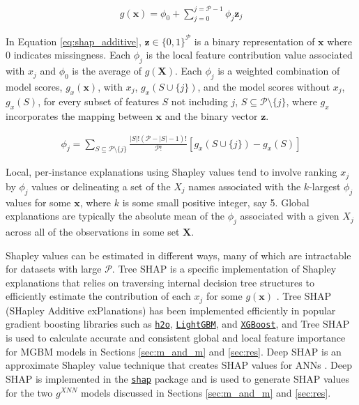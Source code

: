 \documentclass[information,article,submit,moreauthors,pdftex]{definitions/mdpi}
\begin{document}
\begin{equation}
\label{eq:shap_additive}
\begin{aligned}
g(\mathbf{x}) = \phi_0 + \sum_{j=0}^{j=\mathcal{P} - 1} \phi_j \mathbf{z}_j
\end{aligned}
\end{equation}

\noindent In Equation \ref{eq:shap_additive}, $\mathbf{z} \in \{0,1\}^\mathcal{P}$ is a binary representation of $\mathbf{x}$ where 0 indicates missingness. Each $\phi_j$ is the local feature contribution value associated with $x_j$ and $\phi_0$ is the average of $g(\mathbf{X})$. Each $\phi_j$ is a weighted combination of model scores, $g_x(\mathbf{x})$, with $x_j$, $g_x(S \cup \{j\})$, and the model scores without $x_j$, $g_x(S)$, for every subset of features $S$ not including $j$, $S \subseteq \mathcal{P} \setminus \{j\}$, where $g_x$ incorporates the mapping between $\mathbf{x}$ and the binary vector $\mathbf{z}$. 

\begin{equation}
\label{eq:shap_contrib}
\begin{aligned}
\phi_{j} = \sum_{S \subseteq \mathcal{P} \setminus \{j\}}\frac{|S|!(\mathcal{P} -|S| -1)!}{\mathcal{P}!}[g_x(S \cup \{j\}) - g_x(S)]
\end{aligned}
\end{equation}

\noindent Local, per-instance explanations using Shapley values tend to involve ranking $x_j$ by $\phi_j$ values or delineating a set of the $X_j$ names associated with the $k$-largest $\phi_j$ values for some $\mathbf{x}$, where $k$ is some small positive integer, say 5. Global explanations are typically the absolute mean of the $\phi_j$ associated with a given $X_j$ across all of the observations in some set $\mathbf{X}$.

Shapley values can be estimated in different ways, many of which are intractable for datasets with large $\mathcal{P}$. Tree SHAP is a specific implementation of Shapley explanations that relies on traversing internal decision tree structures to efficiently estimate the contribution of each $x_j$ for some $g(\mathbf{x})$ \cite{tree_shap}. Tree SHAP (SHapley Additive exPlanations) has been implemented efficiently in popular gradient boosting libraries such as \href{http://docs.h2o.ai/h2o/latest-stable/h2o-py/docs/modeling.html#h2ogradientboostingestimator}{\texttt{h2o}}, \href{https://lightgbm.readthedocs.io/en/latest/Python-Intro.html}{\texttt{LightGBM}}, and \href{https://xgboost.readthedocs.io/en/latest/python/python_intro.html}{\texttt{XGBoost}}, and Tree SHAP is used to calculate accurate and consistent global and local feature importance for MGBM models in Sections \ref{sec:m_and_m} and \ref{sec:res}. Deep SHAP is an approximate Shapley value technique that creates SHAP values for ANNs \cite{shapley}. Deep SHAP is implemented in the \href{https://github.com/slundberg/shap}{\texttt{shap}} package and is used to generate SHAP values for the two $g^{XNN}$ models discussed in Sections \ref{sec:m_and_m} and \ref{sec:res}.
\end{document}
